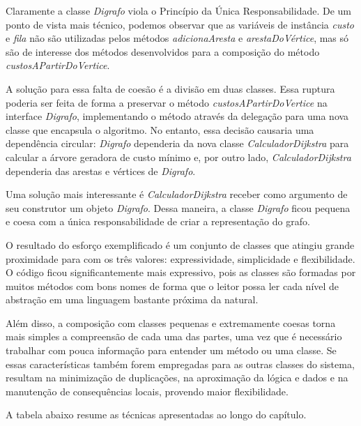Claramente a classe \textit{Digrafo} viola o Princípio da Única Responsabilidade. De um ponto de vista mais técnico, 
podemos observar que as variáveis de instância \textit{custo} e \textit{fila} não são utilizadas pelos métodos 
\textit{adicionaAresta} e \textit{arestaDoVértice}, mas só são de interesse dos métodos desenvolvidos para a composição 
do método \textit{custosAPartirDoVertice}.

A solução para essa falta de coesão é a divisão em duas classes. Essa ruptura poderia ser feita de forma a preservar o 
método \textit{custosAPartirDoVertice} na interface \textit{Digrafo}, implementando o método através da delegação para 
uma nova classe que encapsula o algoritmo. No entanto, essa decisão causaria uma dependência circular: \textit{Digrafo} 
dependeria da nova classe \textit{CalculadorDijkstra} para calcular a árvore geradora de custo mínimo e, por outro lado,
\textit{CalculadorDijkstra} dependeria das arestas e vértices de \textit{Digrafo}.

Uma solução mais interessante é \textit{CalculadorDijkstra} receber como argumento de seu construtor um objeto \textit{Digrafo}. Dessa maneira, a classe \textit{Digrafo} ficou pequena e coesa com a única responsabilidade de criar a representação do grafo.


 
O resultado do esforço exemplificado é um conjunto de classes que atingiu grande proximidade para com os três valores: 
expressividade, simplicidade e flexibilidade.
O código ficou significantemente mais expressivo, pois as classes são formadas por muitos métodos com bons nomes de forma que o leitor possa ler cada nível de abstração em uma linguagem bastante próxima da natural.
 
Além disso, a composição com classes pequenas e extremamente coesas torna mais simples a compreensão de cada uma das partes, uma vez que é necessário trabalhar com pouca informação para entender um método ou uma classe. Se essas características também forem empregadas para as outras classes do sistema, resultam na minimização de duplicações, na aproximação da lógica e dados e na manutenção de consequências locais, provendo maior flexibilidade.

A tabela abaixo resume as técnicas apresentadas ao longo do capítulo.


 
